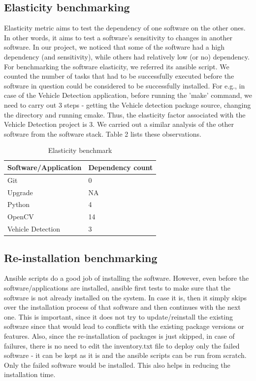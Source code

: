 \documentclass[9pt,twocolumn,twoside]{../../styles/osajnl}
\begin{document}
\subsection{Elasticity benchmarking}
Elasticity metric aims to test the dependency of one software on the
other ones.  In other words, it aims to test a software's sensitivity
to changes in another software.  In our project, we noticed that some
of the software had a high dependency (and sensitivity), while others
had relatively low (or no) dependency.  For benchmarking the software
elasticity, we referred its ansible script.  We counted the number of
tasks that had to be successfully executed before the software in
question could be considered to be successfully installed.  For e.g.,
in case of the Vehicle Detection application, before running the
'make' command, we need to carry out 3 steps - getting the Vehicle
detection package source, changing the directory and running cmake.
Thus, the elasticity factor associated with the Vehicle Detection
project is 3.  We carried out a similar analysis of the other
software from the software stack.  Table 2 lists these observations.

\begin{table}[]
\centering
\caption{Elasticity benchmark}
\label{Table 2}
\begin{tabular}{|l|l|}
\hline
Software/Application & Dependency count \\ \hline
Git & 0 \\ \hline
Upgrade & NA \\ \hline
Python & 4 \\ \hline
OpenCV & 14 \\ \hline
Vehicle Detection & 3 \\ \hline
\end{tabular}
\end{table}

\subsection{Re-installation benchmarking}
Ansible scripts do a good job of installing the software.  However,
even before the software/applications are installed, ansible first
tests to make sure that the software is not already installed on the
system.  In case it is, then it simply skips over the installation
process of that software and then continues with the next one.  This
is important, since it does not try to update/reinstall the existing
software since that would lead to conflicts with the existing package
versions or features.  Also, since the re-installation of packages is
just skipped, in case of failures, there is no need to edit the
inventory.txt file to deploy only the failed software - it can be kept
as it is and the ansible scripts can be run from scratch.  Only the
failed software would be installed.  This also helps in reducing the
installation time.
\end{document}
